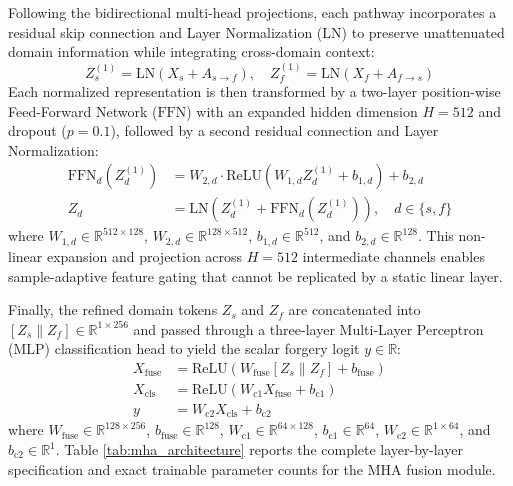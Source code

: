 \documentclass[fleqn,10pt]{wlscirep}
\begin{document}
Following the bidirectional multi-head projections, each pathway incorporates a residual skip connection and Layer Normalization ($\text{LN}$) to preserve unattenuated domain information while integrating cross-domain context:
\begin{equation}
Z^{(1)}_s = \text{LN}\left(X_s + A_{s \to f}\right), \quad Z^{(1)}_f = \text{LN}\left(X_f + A_{f \to s}\right)
\end{equation}
Each normalized representation is then transformed by a two-layer position-wise Feed-Forward Network ($\text{FFN}$) with an expanded hidden dimension $H = 512$ and dropout ($p = 0.1$), followed by a second residual connection and Layer Normalization:
\begin{align}
\text{FFN}_d\left(Z^{(1)}_d\right) &= W_{2,d} \cdot \text{ReLU}\left(W_{1,d} Z^{(1)}_d + b_{1,d}\right) + b_{2,d} \\
Z_d &= \text{LN}\left(Z^{(1)}_d + \text{FFN}_d\left(Z^{(1)}_d\right)\right), \quad d \in \{s, f\}
\end{align}
where $W_{1,d} \in \mathbb{R}^{512 \times 128}$, $W_{2,d} \in \mathbb{R}^{128 \times 512}$, $b_{1,d} \in \mathbb{R}^{512}$, and $b_{2,d} \in \mathbb{R}^{128}$. This non-linear expansion and projection across $H=512$ intermediate channels enables sample-adaptive feature gating that cannot be replicated by a static linear layer.

Finally, the refined domain tokens $Z_s$ and $Z_f$ are concatenated into $[Z_s \parallel Z_f] \in \mathbb{R}^{1 \times 256}$ and passed through a three-layer Multi-Layer Perceptron (MLP) classification head to yield the scalar forgery logit $y \in \mathbb{R}$:
\begin{align}
X_{\text{fuse}} &= \text{ReLU}\left(W_{\text{fuse}} [Z_s \parallel Z_f] + b_{\text{fuse}}\right) \\
X_{\text{cls}} &= \text{ReLU}\left(W_{\text{c1}} X_{\text{fuse}} + b_{\text{c1}}\right) \\
y &= W_{\text{c2}} X_{\text{cls}} + b_{\text{c2}}
\end{align}
where $W_{\text{fuse}} \in \mathbb{R}^{128 \times 256}$, $b_{\text{fuse}} \in \mathbb{R}^{128}$, $W_{\text{c1}} \in \mathbb{R}^{64 \times 128}$, $b_{\text{c1}} \in \mathbb{R}^{64}$, $W_{\text{c2}} \in \mathbb{R}^{1 \times 64}$, and $b_{\text{c2}} \in \mathbb{R}^1$. Table \ref{tab:mha_architecture} reports the complete layer-by-layer specification and exact trainable parameter counts for the MHA fusion module.
\end{document}
